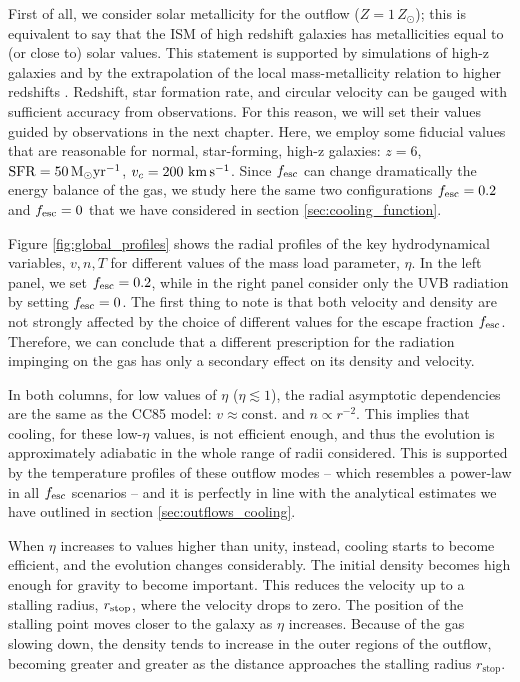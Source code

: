 First of all, we consider solar metallicity for the outflow ($Z=1\,Z_\odot$); this is equivalent to say that the ISM of high redshift galaxies has metallicities equal to (or close to) solar values. This statement is supported by simulations of high-z galaxies \citep[e.g.,][]{pallottini2017} and by the extrapolation of the local mass-metallicity relation to higher redshifts \citep[e.g.,][]{mannucci:2012}. Redshift, star formation rate, and circular velocity can be gauged with sufficient accuracy from observations. For this reason, we will set their values guided by observations in the next chapter. Here, we employ some fiducial values that are reasonable for normal, star-forming, high-z galaxies: $z=6$, $\mathrm{SFR}=50\,{\rm M}_{\odot}\mathrm{yr}^{-1}$, $v_c = 200\,\,\rm km\,s^{-1}$. Since $f_{\rm esc}$ can change dramatically the energy balance of the gas, we study here the same two configurations $f_{\rm esc}=0.2$ and $f_{\rm esc} =0$ that we have considered in section \ref{sec:cooling_function}.


Figure \ref{fig:global_profiles} shows the radial profiles of the key hydrodynamical variables, $v, n, T$ for different values of the mass load parameter, $\eta$. In the left panel, we set $f_{\rm esc}=0.2$, while in the right panel consider only the UVB radiation by setting $f_{\rm esc}=0$. The first thing to note is that both velocity and density are not strongly affected by the choice of different values for the escape fraction $f_{\rm esc}$. Therefore, we can conclude that a different prescription for the radiation impinging on the gas has only a secondary effect on its density and velocity. 

In both columns, for low values of $\eta$ ($\eta \lesssim 1$), the radial asymptotic dependencies are the same as the CC85 model: $v \approx \mathrm{const.}$ and $n\propto r^{-2}$. This implies that cooling, for these low-$\eta$ values, is not efficient enough, and thus the evolution is approximately adiabatic in the whole range of radii considered. This is supported by the temperature profiles of these outflow modes -- which resembles a power-law in all $f_{\rm esc}$ scenarios -- and it is perfectly in line with the analytical estimates we have outlined in section \ref{sec:outflows_cooling}. 

When $\eta$ increases to values higher than unity, instead, cooling starts to become efficient, and the evolution changes considerably. The initial density becomes high enough for gravity to become important. This reduces the velocity up to a stalling radius, $r_{\rm stop}$, where the velocity drops to zero. The position of the stalling point moves closer to the galaxy as $\eta$ increases. Because of the gas slowing down, the density tends to increase in the outer regions of the outflow, becoming greater and greater as the distance approaches the stalling radius $r_\mathrm{stop}$. 

